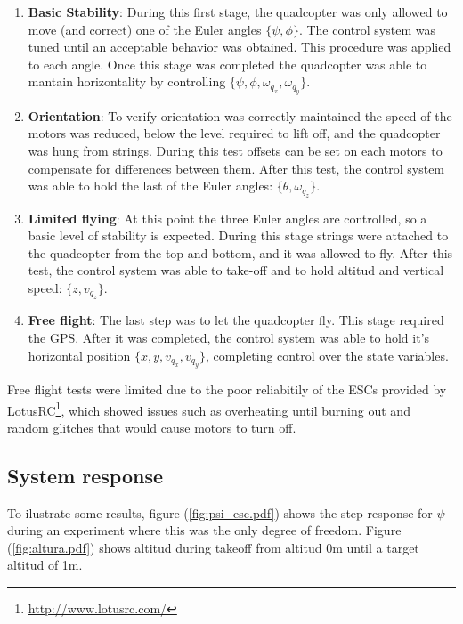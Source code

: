 \documentclass[conference]{IEEEtran}
\newcommand{\refp}[1]{(\ref{#1})}
\begin{document}
\begin{enumerate}
\item \textbf{Basic Stability}: During this first stage, the quadcopter was only allowed to move (and correct) one of the Euler angles $\{\psi,\phi\}$. The control system was tuned until an acceptable behavior was obtained. This procedure was applied to each angle. Once this stage was completed the quadcopter was able to mantain horizontality by controlling $\{\psi,\phi,\omega_{q_x},\omega_{q_y}\}$.
\item \textbf{Orientation}: To verify orientation was correctly maintained the speed of the motors was reduced, below the level required to lift off, and the quadcopter was hung from strings. During this test offsets can be set on each motors to compensate for differences between them. After this test, the control system was able to hold the last of the Euler angles: $\{\theta,\omega_{q_z}\}$.
\item \textbf{Limited flying}: At this point the three Euler angles are controlled, so a basic level of stability is expected. During this stage strings were attached to the quadcopter from the top and bottom, and it was allowed to fly. After this test, the control system was able to take-off and to hold altitud and vertical speed: $\{z,v_{q_z}\}$.
\item \textbf{Free flight}: The last step was to let the quadcopter fly. This stage required the GPS. After it was completed, the control system was able to hold it's horizontal position $\{x,y,v_{q_x},v_{q_y}\}$, completing control over the state variables.
\end{enumerate}

Free flight tests were limited due to the poor reliabitily of the ESCs provided by LotusRC\footnote{\url{http://www.lotusrc.com/}}, which showed issues such as overheating until burning out and random glitches that would cause motors to turn off.

\subsection{System response}
\label{sec:results-system-response}

To ilustrate some results, figure \refp{fig:psi_esc.pdf} shows the step response for $\psi$ during an experiment where this was the only degree of freedom. Figure \refp{fig:altura.pdf} shows altitud during takeoff from altitud 0m until a target altitud of 1m.
\end{document}

